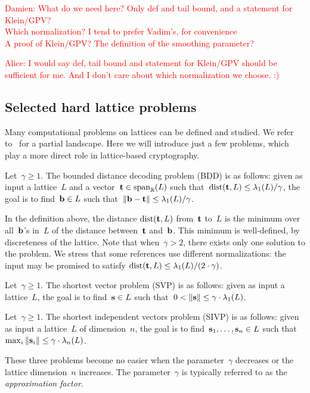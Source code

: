 \textcolor{red}{
Damien: What do we need here? Only def and tail bound, and a statement for Klein/GPV? \\
Which normalization? I tend to prefer Vadim's, for convenience \\
A proof of Klein/GPV? The definition of the smoothing parameter?
}

\textcolor{red}{
Alice: I would say def, tail bound and statement for Klein/GPV should be sufficient for me. And I don't care about which normalization we choose. :)
}

\subsection{Selected hard lattice problems}

Many computational problems on lattices can be defined and studied. We refer to~\cite{NSD15} for a partial landscape. 
Here we will introduce just a few problems, which play a more direct role in lattice-based cryptography.

\begin{definition}
Let~$\gamma \geq 1$. 
The bounded distance decoding problem (BDD) is as follows: given as input a lattice~$L$ and a vector~${\bf t} \in \mbox{span}_{\mathbb{R}}(L)$ such that~$\mbox{dist}({\bf t}, L) \leq \lambda_1(L) / \gamma$, the goal is to find~${\bf b} \in L$ such that~$\|{\bf b} - {\bf t}\| \leq \lambda_1(L) / \gamma$. 
\end{definition}

In the definition above, the distance $\mbox{dist}({\bf t}, L)$ from~${\bf t}$ to~$L$ is the minimum over all~${\bf b}$'s in~$L$ of the distance between~${\bf t}$ and~${\bf b}$. This minimum is well-defined, by discreteness of the lattice.
Note that when~$\gamma > 2$, there exists only one solution to the problem. We stress that some references use different normalizations: 
the input may be promised to satisfy $\mbox{dist}({\bf t}, L) \leq \lambda_1(L) / (2 \cdot \gamma)$. 

\begin{definition}
Let~$\gamma \geq 1$. 
The shortest vector problem (SVP) is as follows: given as input a lattice~$L$, the goal is to find~${\bf s} \in L$ such that~$0 < \|{\bf s}\| \leq \gamma \cdot \lambda_1(L)$. 
\end{definition}

\begin{definition}
Let~$\gamma \geq 1$. 
The shortest independent vectors problem (SIVP) is as follows: given as input a lattice~$L$ of dimension~$n$, the goal is to 
find~${\bf s}_1,\ldots,{\bf s}_n \in L$ such that~$\max_i \|{\bf s}_i \|  \leq \gamma \cdot \lambda_n(L)$. 
\end{definition}

These three problems become no easier when the parameter~$\gamma$ decreases or the lattice dimension~$n$ increases. 
The parameter~$\gamma$ is typically referred to as the \emph{approximation factor}. 



